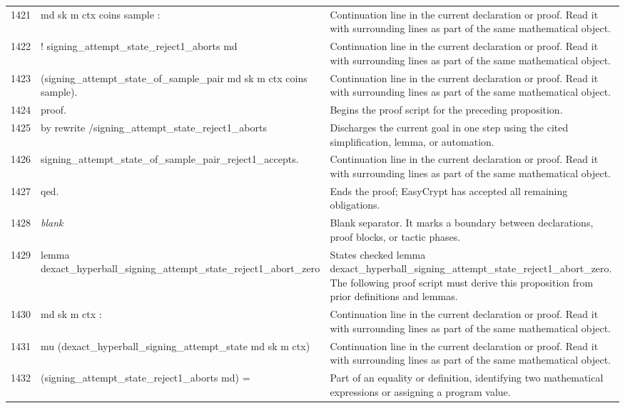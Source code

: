 \documentclass[10pt]{article}
\begin{document}
\begin{longtable}{r L{0.53\textwidth} L{0.37\textwidth}}
1421 & {\ttfamily\scriptsize    md sk m ctx coins sample :} & Continuation line in the current declaration or proof.  Read it with surrounding lines as part of the same mathematical object. \\
1422 & {\ttfamily\scriptsize   ! signing\_attempt\_state\_reject1\_aborts md} & Continuation line in the current declaration or proof.  Read it with surrounding lines as part of the same mathematical object. \\
1423 & {\ttfamily\scriptsize       (signing\_attempt\_state\_of\_sample\_pair md sk m ctx coins sample).} & Continuation line in the current declaration or proof.  Read it with surrounding lines as part of the same mathematical object. \\
1424 & {\ttfamily\scriptsize proof.} & Begins the proof script for the preceding proposition. \\
1425 & {\ttfamily\scriptsize by rewrite /signing\_attempt\_state\_reject1\_aborts} & Discharges the current goal in one step using the cited simplification, lemma, or automation. \\
1426 & {\ttfamily\scriptsize            signing\_attempt\_state\_of\_sample\_pair\_reject1\_accepts.} & Continuation line in the current declaration or proof.  Read it with surrounding lines as part of the same mathematical object. \\
1427 & {\ttfamily\scriptsize qed.} & Ends the proof; EasyCrypt has accepted all remaining obligations. \\
1428 & {\ttfamily\scriptsize \emph{blank}} & Blank separator.  It marks a boundary between declarations, proof blocks, or tactic phases. \\
1429 & {\ttfamily\scriptsize lemma dexact\_hyperball\_signing\_attempt\_state\_reject1\_abort\_zero} & States checked lemma dexact\_hyperball\_signing\_attempt\_state\_reject1\_abort\_zero.  The following proof script must derive this proposition from prior definitions and lemmas. \\
1430 & {\ttfamily\scriptsize   md sk m ctx :} & Continuation line in the current declaration or proof.  Read it with surrounding lines as part of the same mathematical object. \\
1431 & {\ttfamily\scriptsize   mu (dexact\_hyperball\_signing\_attempt\_state md sk m ctx)} & Continuation line in the current declaration or proof.  Read it with surrounding lines as part of the same mathematical object. \\
1432 & {\ttfamily\scriptsize     (signing\_attempt\_state\_reject1\_aborts md) =} & Part of an equality or definition, identifying two mathematical expressions or assigning a program value. \\

\end{longtable}
\end{document}
